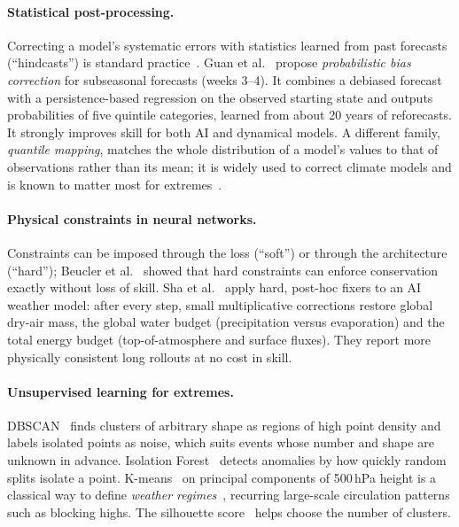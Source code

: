 \documentclass{article}
\begin{document}
\paragraph{Statistical post-processing.}
Correcting a model's systematic errors with statistics learned from past forecasts (``hindcasts'') is standard
practice~\cite{wilks2011statistical}. Guan et al.~\cite{guan2026pbc} propose \emph{probabilistic bias correction}
for subseasonal forecasts (weeks 3--4). It combines a debiased forecast with a persistence-based
regression on the observed starting state and outputs probabilities of five quintile categories, learned from about 20 years of reforecasts.
It strongly improves skill for both AI and dynamical models. A different family, \emph{quantile mapping}, matches the whole distribution of a model's values to that of
observations rather than its mean; it is widely used to correct climate models and is known to matter most for extremes~\cite{cannon2015qm}.

\paragraph{Physical constraints in neural networks.}
Constraints can be imposed through the loss (``soft'') or through the architecture (``hard''); Beucler et al.~\cite{beucler2021enforcing}
showed that hard constraints can enforce conservation exactly without loss of skill. Sha et al.~\cite{sha2025conservation}
apply hard, post-hoc fixers to an AI weather model: after every step, small multiplicative corrections restore global
dry-air mass, the global water budget (precipitation versus evaporation) and the total energy budget (top-of-atmosphere and
surface fluxes). They report more physically consistent long rollouts at no cost in skill.

\paragraph{Unsupervised learning for extremes.}
DBSCAN~\cite{ester1996dbscan} finds clusters of arbitrary shape as regions of high point density and labels isolated
points as noise, which suits events whose number and shape are unknown in advance. Isolation Forest~\cite{liu2008isolation}
detects anomalies by how quickly random splits isolate a point. K-means~\cite{lloyd1982kmeans} on principal components
of 500\,hPa height is a classical way to define \emph{weather regimes}~\cite{michelangeli1995regimes}, recurring large-scale
circulation patterns such as blocking highs. The silhouette score~\cite{rousseeuw1987silhouettes} helps choose the number of clusters.
\end{document}

